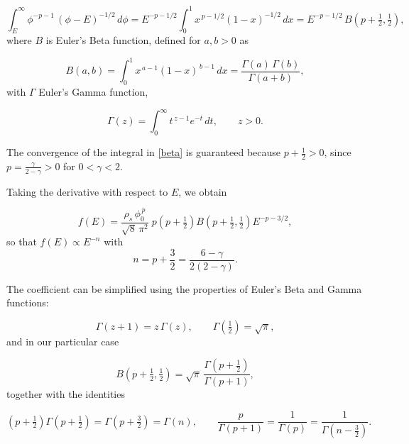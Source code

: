 \begin{equation} \label{beta}
\int_{E}^{\infty} \phi^{-p-1}\, (\phi-E)^{-1/2}\, d\phi
= E^{-p-1/2} \int_0^1 x^{\,p-1/2} (1-x)^{-1/2}\, dx
= E^{-p-1/2}\, B\!\left(p+\tfrac12, \tfrac12\right),
\end{equation}
where $B$ is Euler's Beta function, defined for $a,b > 0$ as

\begin{equation}
B(a,b) = \int_0^1 x^{\,a-1}(1-x)^{\,b-1}\, dx
= \frac{\Gamma(a)\,\Gamma(b)}{\Gamma(a+b)},
\end{equation}
with $\Gamma$ Euler's Gamma function,

\begin{equation} \label{eq:app_gammadef}
\Gamma(z) = \int_0^{\infty} t^{\,z-1} e^{-t}\, dt ,
\qquad z > 0 .
\end{equation}

The convergence of the integral in \cref{beta} is guaranteed
because $p + \tfrac12 > 0$, since $p = \frac{\gamma}{2-\gamma} > 0$ for $0 < \gamma < 2$.

Taking the derivative with respect to $E$, we obtain

\begin{equation}
f(E)
= \frac{\rho_s\, \phi_0^{\,p}}{\sqrt{8}\,\pi^2}\;
p \left(p+\tfrac12\right) B\!\left(p+\tfrac12,\tfrac12\right)
E^{-p-3/2} ,
\end{equation}
so that $f(E) \propto E^{-n}$ with
\begin{equation}
n = p + \frac{3}{2} = \frac{6-\gamma}{2(2-\gamma)} .
\end{equation}

The coefficient can be simplified using the properties of Euler's Beta and Gamma functions:

\begin{equation} \label{eq:app_gammaprop}
\Gamma(z+1) = z\,\Gamma(z),
\qquad
\Gamma\!\left(\tfrac12\right) = \sqrt{\pi} ,
\end{equation}
and in our particular case

\begin{equation}
B\!\left(p+\tfrac12,\tfrac12\right)
= \sqrt{\pi}\,\frac{\Gamma\!\left(p+\tfrac12\right)}{\Gamma(p+1)} ,
\end{equation}
together with the identities

\begin{equation}
\left(p+\tfrac12\right)\Gamma\!\left(p+\tfrac12\right)
= \Gamma\!\left(p+\tfrac32\right) = \Gamma(n),
\qquad
\frac{p}{\Gamma(p+1)} = \frac{1}{\Gamma(p)} = \frac{1}{\Gamma\!\left(n-\tfrac32\right)} .
\end{equation}

